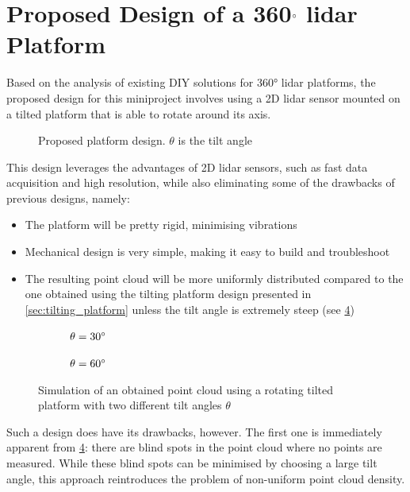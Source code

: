 \section{Proposed Design of a 360$\degree$ \gls{lidar} Platform}
\label{sec:proposed_design}
Based on the analysis of existing DIY solutions for 360° \gls{lidar} platforms, the proposed design for this miniproject involves using a 2D \gls{lidar} sensor mounted on a tilted platform that is able to rotate around its axis.
\begin{figure}[H]
    \caption{Proposed platform design. \protect$\theta$ is the tilt angle}
    
    \label{fig:tikz_platform}
\end{figure}
This design leverages the advantages of 2D \gls{lidar} sensors, such as fast data acquisition and high resolution, while also eliminating some of the drawbacks of previous designs, namely:
\begin{itemize}[label=\textcolor{green!60!black}{\textbf{+}}]
    \item The platform will be pretty rigid, minimising vibrations
    \item Mechanical design is very simple, making it easy to build and troubleshoot
    \item The resulting point cloud will be more uniformly distributed compared to the one obtained using the tilting platform design presented in \cref{sec:tilting_platform} unless the tilt angle is extremely steep (see \cref{fig:rotate_pointCloud})
\end{itemize}
\begin{figure}[h!]
    \centering
    
    \begin{subfigure}{0.45\linewidth}
        \centering
        
        \caption{$\theta=30\degree$}
        \label{fig:rotate_pointCloud:30}
    \end{subfigure}
    \hfill
    \begin{subfigure}{0.45\linewidth}
        \centering
        
        \caption{$\theta=60\degree$}
        \label{fig:rotate_pointCloud:60}
    \end{subfigure}

    \caption{Simulation of an obtained point cloud using a rotating tilted platform with two different tilt angles $\theta$}
    \label{fig:rotate_pointCloud}
\end{figure}

Such a design does have its drawbacks, however. The first one is immediately apparent from \cref{fig:rotate_pointCloud}: there are blind spots in the point cloud where no points are measured.
While these blind spots can be minimised by choosing a large tilt angle, this approach reintroduces the problem of non-uniform point cloud density.

